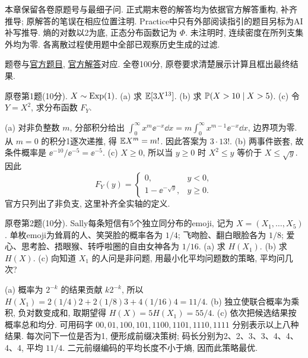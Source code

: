 本章保留各卷原题号与最细子问. 正式期末卷的解答均为依据官方解答重构, 补齐推导; 原解答的笔误在相应位置注明. Practice中只有外部阅读指引的题目另标为AI补写推导. 熵的对数以2为底, 正态分布函数记为 $\Phi$. 未注明时, 连续密度在所列支集外均为零. 各离散过程使用题中全部已观察历史生成的过滤.

题卷与\href{https://ocw.mit.edu/courses/18-600-probability-and-random-variables-fall-2019/resources/mit18_600f19_final_2017/}{官方题目}, \href{https://ocw.mit.edu/courses/18-600-probability-and-random-variables-fall-2019/resources/mit18_600f19_final_2017_soln/}{官方解答}对应. 全卷100分, 原卷要求清楚展示计算且框出最终结果.

\begin{exercise}\label{ex:fl17-1}
原卷第1题(10分). $X\sim\operatorname{Exp}(1)$. (a) 求 $\mathbb E[3X^{13}]$. (b) 求 $\mathbb P(X>10\mid X>5)$. (c) 令 $Y=X^2$, 求分布函数 $F_Y$.
\end{exercise}
\begin{solution}
(a)\label{sol:fl17-1-a} 对非负整数 $m$, 分部积分给出
$\int_0^\infty x^m\ee^{-x}\dd x=m\int_0^\infty x^{m-1}\ee^{-x}\dd x$, 边界项为零. 从 $m=0$ 的积分1逐次递推, 得 $\mathbb E X^m=m!$. 因此答案为 $3\cdot13!$.
(b)\label{sol:fl17-1-b} 两事件嵌套, 故条件概率是 $\ee^{-10}/\ee^{-5}=\ee^{-5}$.
(c)\label{sol:fl17-1-c} $X\geq0$, 所以当 $y\geq0$ 时 $X^2\leq y$ 等价于 $X\leq\sqrt y$. 因此
\[F_Y(y)=\begin{cases}0,&y<0,\\1-\ee^{-\sqrt y},&y\geq0.\end{cases}\]
官方只列出了非负支, 这里补齐全实轴的定义.
\end{solution}

\begin{exercise}\label{ex:fl17-2}
原卷第2题(10分). Sally每条短信有5个独立同分布的emoji, 记为 $X=(X_1,\ldots,X_5)$. 单枚emoji为耸肩的人、笑哭脸的概率各为 $1/4$; 飞吻脸、翻白眼脸各为 $1/8$; 爱心、思考脸、捂眼猴、转呼啦圈的自由女神各为 $1/16$. (a) 求 $H(X_1)$. (b) 求 $H(X)$. (c) 向知道 $X_1$ 的人问是非问题, 用最小化平均问题数的策略, 平均问几次?
\end{exercise}
\begin{solution}
(a)\label{sol:fl17-2-a} 概率为 $2^{-k}$ 的结果贡献 $k2^{-k}$, 所以
$H(X_1)=2(1/4)2+2(1/8)3+4(1/16)4=11/4$.
(b)\label{sol:fl17-2-b} 独立使联合概率为乘积, 负对数变成和, 取期望得 $H(X)=5H(X_1)=55/4$.
(c)\label{sol:fl17-2-c} 依次把候选结果按概率总和均分. 可用码字 $00,01,100,101,1100,1101,1110,1111$ 分别表示以上八种结果. 每次问下一位是否为1, 便形成前缀决策树; 码长分别为2、2、3、3、4、4、4、4, 平均 $11/4$. 二元前缀编码的平均长度不小于熵, 因而此策略最优.
\end{solution}

